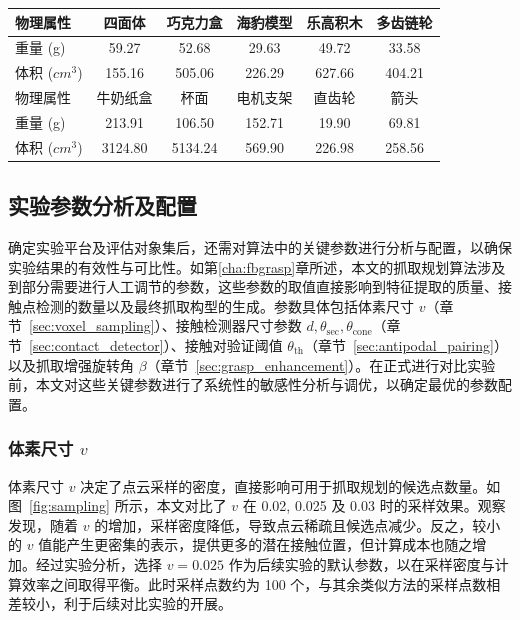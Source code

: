 \begin{table}[htbp]
    \centering
    \small
    \setlength{\tabcolsep}{13pt}
    \label{tab:object_measurements}
    \begin{tabular}{lccccc}
        \toprule
        物理属性 & 四面体 & 巧克力盒 & 海豹模型 & 乐高积木 & 多齿链轮 \\
        \midrule
        重量 (g) & 59.27 & 52.68 & 29.63 & 49.72 & 33.58 \\
        体积 ($cm^3$) & 155.16 & 505.06 & 226.29 & 627.66 & 404.21 \\
        \midrule
        物理属性 & 牛奶纸盒 & 杯面 & 电机支架 & 直齿轮 & 箭头 \\
        \midrule
        重量 (g) & 213.91 & 106.50 & 152.71 & 19.90 & 69.81 \\
        体积 ($cm^3$) & 3124.80 & 5134.24 & 569.90 & 226.98 & 258.56 \\
        \bottomrule
    \end{tabular}
\end{table}

\subsection{实验参数分析及配置}
\label{sec:parameter_analysis}
确定实验平台及评估对象集后，还需对算法中的关键参数进行分析与配置，以确保实验结果的有效性与可比性。如第\ref{cha:fbgrasp}章所述，本文的抓取规划算法涉及到部分需要进行人工调节的参数，这些参数的取值直接影响到特征提取的质量、接触点检测的数量以及最终抓取构型的生成。参数具体包括体素尺寸 $v$（章节~\ref{sec:voxel_sampling}）、接触检测器尺寸参数 $d, \theta_\mathrm{sec}, \theta_\mathrm{cone}$（章节~\ref{sec:contact_detector}）、接触对验证阈值 $\theta_\mathrm{th}$（章节~\ref{sec:antipodal_pairing}） 以及抓取增强旋转角 $\beta$（章节~\ref{sec:grasp_enhancement}）。在正式进行对比实验前，本文对这些关键参数进行了系统性的敏感性分析与调优，以确定最优的参数配置。

\subsubsection{体素尺寸 $v$}
体素尺寸 $v$ 决定了点云采样的密度，直接影响可用于抓取规划的候选点数量。如图~\ref{fig:sampling} 所示，本文对比了 $v$ 在 0.02, 0.025 及 0.03 时的采样效果。观察发现，随着 $v$ 的增加，采样密度降低，导致点云稀疏且候选点减少。反之，较小的 $v$ 值能产生更密集的表示，提供更多的潜在接触位置，但计算成本也随之增加。经过实验分析，选择 $v=0.025$ 作为后续实验的默认参数，以在采样密度与计算效率之间取得平衡。此时采样点数约为 100 个，与其余类似方法的采样点数相差较小，利于后续对比实验的开展。


